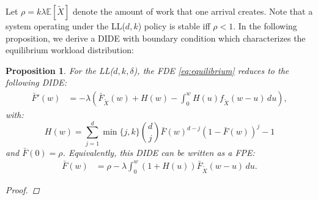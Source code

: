 \documentclass[12pt]{report}
\newcommand{\E}{\mathbb{E}}
\newtheorem{proposition}[theorem]{Proposition}
\begin{document}
Let $\rho=k \lambda \E[\tilde X]$ denote the amount of work that one arrival creates. Note that a system operating under the LL($d,k$) policy is stable iff $\rho <1$. In the following proposition, we derive a DIDE with boundary condition which characterizes the equilibrium workload distribution:
\begin{proposition} \label{prop:LLdk}
For the LL($d,k,\delta$), the FDE \eqref{eq:equilibrium} reduces to the following DIDE:
\begin{align}
\bar F'(w)&=-\lambda \left( \bar F_{\tilde{X}}(w) + H(w) - \int_0^w H(u) f_{\tilde{X}}(w-u)\, du \right), \label{eq:equilWL_IDE}
\end{align}
with:
\begin{equation}
\label{eq:H_w}
H(w)=\sum_{j=1}^d \min\{j,k\} \binom{d}{j} \bar F(w)^{d-j} (1-\bar F(w))^{j}-1 
\end{equation}
and $\bar F(0)=\rho$. Equivalently, this DIDE can be written as a FPE:
\begin{align}
\bar F(w) &= \rho - \lambda \int_0^w (1+H(u))\bar F_{\tilde{X}}(w-u)\, du. \label{eq:equilWL_FPE}
\end{align}
\begin{proof}


\end{proof}
\end{proposition}
\end{document}
